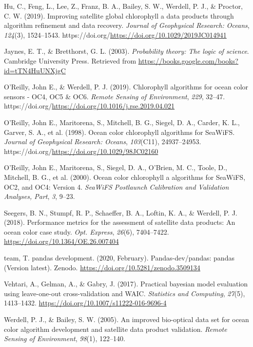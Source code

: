 \documentclass[
]{agujournal2019}
\newlength{\cslhangindent}
\newenvironment{CSLReferences}[2] %
 {\begin{list}{}{%
  \setlength{\itemindent}{0pt}
  \setlength{\leftmargin}{0pt}
  \setlength{\parsep}{0pt}
  \ifodd #1
   \setlength{\leftmargin}{\cslhangindent}
   \setlength{\itemindent}{-1\cslhangindent}
  \fi
  \setlength{\itemsep}{#2\baselineskip}}}
 {\end{list}}
\begin{document}
\begin{CSLReferences}{1}{0}
Hu, C., Feng, L., Lee, Z., Franz, B. A., Bailey, S. W., Werdell, P. J.,
\& Proctor, C. W. (2019). Improving satellite global chlorophyll a data
products through algorithm refinement and data recovery. \emph{Journal
of Geophysical Research: Oceans}, \emph{124}(3), 1524--1543.
https://doi.org/\url{https://doi.org/10.1029/2019JC014941}

Jaynes, E. T., \& Bretthorst, G. L. (2003). \emph{Probability theory:
The logic of science}. Cambridge University Press. Retrieved from
\url{https://books.google.com/books?id=tTN4HuUNXjgC}

O'Reilly, John E., \& Werdell, P. J. (2019). Chlorophyll algorithms for
ocean color sensors - OC4, OC5 \& OC6. \emph{Remote Sensing of
Environment}, \emph{229}, 32--47.
https://doi.org/\url{https://doi.org/10.1016/j.rse.2019.04.021}

O'Reilly, John E., Maritorena, S., Mitchell, B. G., Siegel, D. A.,
Carder, K. L., Garver, S. A., et al. (1998). Ocean color chlorophyll
algorithms for SeaWiFS. \emph{Journal of Geophysical Research: Oceans},
\emph{103}(C11), 24937--24953.
https://doi.org/\url{https://doi.org/10.1029/98JC02160}

O'Reilly, John E., Maritorena, S., Siegel, D. A., O'Brien, M. C., Toole,
D., Mitchell, B. G., et al. (2000). Ocean color chlorophyll a algorithms
for SeaWiFS, OC2, and OC4: Version 4. \emph{SeaWiFS Postlaunch
Calibration and Validation Analyses, Part}, \emph{3}, 9--23.

Seegers, B. N., Stumpf, R. P., Schaeffer, B. A., Loftin, K. A., \&
Werdell, P. J. (2018). Performance metrics for the assessment of
satellite data products: An ocean color case study. \emph{Opt. Express},
\emph{26}(6), 7404--7422. \url{https://doi.org/10.1364/OE.26.007404}

team, T. pandas development. (2020, February). Pandas-dev/pandas: pandas
(Version latest). Zenodo. \url{https://doi.org/10.5281/zenodo.3509134}

Vehtari, A., Gelman, A., \& Gabry, J. (2017). Practical bayesian model
evaluation using leave-one-out cross-validation and WAIC.
\emph{Statistics and Computing}, \emph{27}(5), 1413--1432.
\url{https://doi.org/10.1007/s11222-016-9696-4}

Werdell, P. J., \& Bailey, S. W. (2005). An improved bio-optical data
set for ocean color algorithm development and satellite data product
validation. \emph{Remote Sensing of Environment}, \emph{98}(1),
122--140.

\end{CSLReferences}
\end{document}
